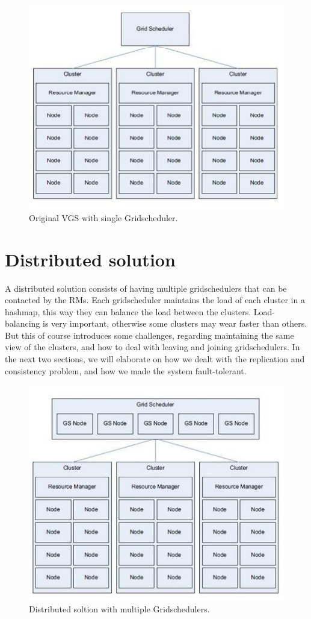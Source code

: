 \documentclass[twocolumn,a4paper]{article}
\begin{document}
\begin{figure}
	\includegraphics[scale=0.7]{singleGS.jpg}
	\caption{Original VGS with single Gridscheduler.}
\end{figure}

\section{Distributed solution}
A distributed solution consists of having multiple gridschedulers that can be contacted by the RMs. Each gridscheduler maintains the load of each cluster in a hashmap, this way they can balance the load between the clusters. Load-balancing is very important, otherwise some clusters may wear faster than others. But this of course introduces some challenges, regarding maintaining the same view of the clusters, and how to deal with leaving and joining gridschedulers. In the next two sections, we will elaborate on how we dealt with the replication and consistency problem, and how we made the system fault-tolerant.

\begin{figure}
	\includegraphics[scale=0.7]{distributedGS.jpg}
	\caption{Distributed soltion with multiple Gridschedulers.}
\end{figure}
\end{document}
